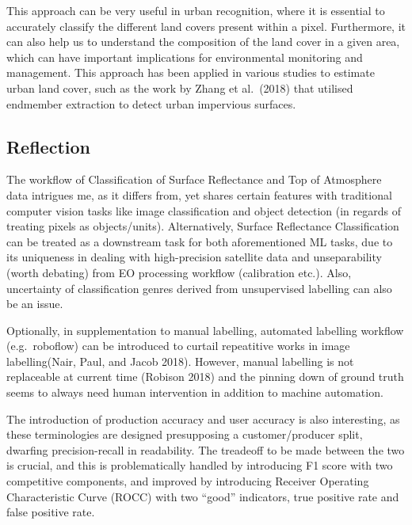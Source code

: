 \documentclass[
  letterpaper,
  DIV=11,
  numbers=noendperiod]{scrreprt}
\begin{document}
This approach can be very useful in urban recognition, where it is
essential to accurately classify the different land covers present
within a pixel. Furthermore, it can also help us to understand the
composition of the land cover in a given area, which can have important
implications for environmental monitoring and management. This approach
has been applied in various studies to estimate urban land cover, such
as the work by Zhang et al.~(2018) that utilised endmember extraction to
detect urban impervious surfaces.

\hypertarget{reflection-3}{%
\section{Reflection}\label{reflection-3}}

The workflow of Classification of Surface Reflectance and Top of
Atmosphere data intrigues me, as it differs from, yet shares certain
features with traditional computer vision tasks like image
classification and object detection (in regards of treating pixels as
objects/units). Alternatively, Surface Reflectance Classification can be
treated as a downstream task for both aforementioned ML tasks, due to
its uniqueness in dealing with high-precision satellite data and
unseparability (worth debating) from EO processing workflow (calibration
etc.). Also, uncertainty of classification genres derived from
unsupervised labelling can also be an issue.

Optionally, in supplementation to manual labelling, automated labelling
workflow (e.g.~roboflow) can be introduced to curtail repeatitive works
in image labelling(Nair, Paul, and Jacob 2018). However, manual
labelling is not replaceable at current time (Robison 2018) and the
pinning down of ground truth seems to always need human intervention in
addition to machine automation.

The introduction of production accuracy and user accuracy is also
interesting, as these terminologies are designed presupposing a
customer/producer split, dwarfing precision-recall in readability. The
treadeoff to be made between the two is crucial, and this is
problematically handled by introducing F1 score with two competitive
components, and improved by introducing Receiver Operating
Characteristic Curve (ROCC) with two ``good'' indicators, true positive
rate and false positive rate.


\hypertarget{section}{%
\chapter{}\label{section}}
\end{document}
